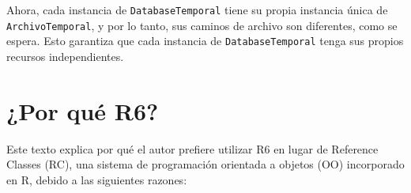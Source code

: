 \documentclass[
]{book}
\newenvironment{Shaded}{\begin{snugshade}}{\end{snugshade}}
\newcommand{\AttributeTok}[1]{\textcolor[rgb]{0.13,0.29,0.53}{#1}}
\newcommand{\ConstantTok}[1]{\textcolor[rgb]{0.56,0.35,0.01}{#1}}
\newcommand{\ControlFlowTok}[1]{\textcolor[rgb]{0.13,0.29,0.53}{\textbf{#1}}}
\newcommand{\DocumentationTok}[1]{\textcolor[rgb]{0.56,0.35,0.01}{\textbf{\textit{#1}}}}
\newcommand{\FunctionTok}[1]{\textcolor[rgb]{0.13,0.29,0.53}{\textbf{#1}}}
\newcommand{\NormalTok}[1]{#1}
\newcommand{\OtherTok}[1]{\textcolor[rgb]{0.56,0.35,0.01}{#1}}
\newcommand{\SpecialCharTok}[1]{\textcolor[rgb]{0.81,0.36,0.00}{\textbf{#1}}}
\newcommand{\StringTok}[1]{\textcolor[rgb]{0.31,0.60,0.02}{#1}}
\begin{document}
\begin{Shaded}
\end{Shaded}

Ahora, cada instancia de \texttt{DatabaseTemporal} tiene su propia instancia única de \texttt{ArchivoTemporal}, y por lo tanto, sus caminos de archivo son diferentes, como se espera. Esto garantiza que cada instancia de \texttt{DatabaseTemporal} tenga sus propios recursos independientes.

\hypertarget{por-quuxe9-r6}{%
\section{¿Por qué R6?}\label{por-quuxe9-r6}}

Este texto explica por qué el autor prefiere utilizar R6 en lugar de Reference Classes (RC), una sistema de programación orientada a objetos (OO) incorporado en R, debido a las siguientes razones:
\end{document}
